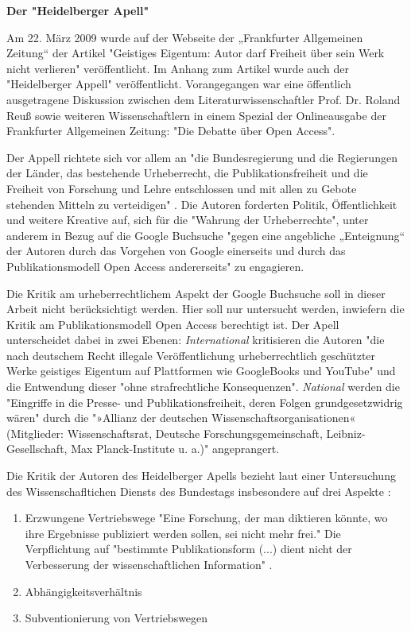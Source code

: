 \textbf{Der "Heidelberger Apell"}

Am 22. März 2009 wurde auf der Webseite der „Frankfurter Allgemeinen Zeitung“ der Artikel "Geistiges Eigentum: Autor darf Freiheit über sein Werk nicht verlieren" \cite{faz_heidelberger_apell_2009} veröffentlicht. Im Anhang zum Artikel wurde auch der "Heidelberger Appell" veröffentlicht. Vorangegangen war eine öffentlich ausgetragene Diskussion zwischen dem Literaturwissenschaftler Prof. Dr. Roland Reuß sowie weiteren Wissenschaftlern in einem Spezial der Onlineausgabe der Frankfurter Allgemeinen Zeitung: "Die Debatte über Open Access".


Der Appell richtete sich vor allem an "die Bundesregierung und die Regierungen der Länder, das bestehende Urheberrecht, die Publikationsfreiheit und die Freiheit von Forschung und Lehre entschlossen und mit allen zu Gebote stehenden Mitteln zu verteidigen" \cite{ITK_2009}. Die Autoren forderten Politik, Öffentlichkeit und weitere Kreative auf, sich für die "Wahrung der Urheberrechte", unter anderem in Bezug auf die Google Buchsuche "gegen eine angebliche „Enteignung“ der Autoren durch das Vorgehen von Google einerseits und durch das Publikationsmodell Open Access andererseits" \cite{WD_bundestag_2009} zu engagieren. 

Die Kritik am urheberrechtlichem Aspekt der Google Buchsuche soll in dieser Arbeit nicht berücksichtigt werden. Hier soll nur untersucht werden, inwiefern die Kritik am Publikationsmodell Open Access berechtigt ist. Der Apell unterscheidet dabei in zwei Ebenen: \textit{International} kritisieren die Autoren "die nach deutschem Recht illegale Veröffentlichung urheberrechtlich geschützter Werke geistiges Eigentum auf Plattformen wie GoogleBooks und YouTube" und die Entwendung dieser "ohne strafrechtliche Konsequenzen". \textit{National} werden die "Eingriffe in die Presse- und Publikationsfreiheit, deren Folgen grundgesetzwidrig wären" durch die "»Allianz der deutschen Wissenschaftsorganisationen« (Mitglieder: Wissenschaftsrat, Deutsche Forschungsgemeinschaft, Leibniz-Gesellschaft, Max Planck-Institute u. a.)" angeprangert.\cite{ITK_2009}

Die Kritik der Autoren des Heidelberger Apells bezieht laut einer Untersuchung des Wissenschafltichen Diensts des Bundestags insbesondere auf drei Aspekte \cite{WD_bundestag_2009}:
\begin{enumerate}
\item Erzwungene Vertriebswege
"Eine Forschung, der man diktieren könnte, wo ihre Ergebnisse publiziert werden sollen, sei nicht mehr frei." Die Verpflichtung auf "bestimmte Publikationsform (...) dient nicht der Verbesserung der wissenschaftlichen Information" \cite{ITK_2009}.
\item Abhängigkeitsverhältnis
\item Subventionierung von Vertriebswegen
\end{enumerate}

